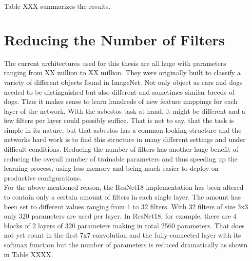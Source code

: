 Table XXX summarizes the results.

\begin{table}[h] \centering
{}
\caption{Resnet18 FiveCrop Implementation with and without pre-training. FINAL (regular) means ResNet18 with the resizing of the image instead of cropping and averaging}
\label{tbl:resnet18-randomnine}
\end{table}

\section{Reducing the Number of Filters}

The current architectures used for this thesis are all huge with parameters ranging from XX million to XX million. They were originally built to classify a variety of different objects found in ImageNet. Not only object as cars and dogs needed to be distinguished but also different and sometimes similar breeds of dogs. Thus it makes sense to learn hundreds of new feature mappings for each layer of the network. With the asbestos task at hand, it might be different and a few filters per layer could possibly suffice. That is not to say, that the task is simple in its nature, but that asbestos has a common looking structure and the networks hard work is to find this structure in many different settings and under difficult conditions. Reducing the number of filters has another huge benefit of reducing the overall number of trainable parameters and thus speeding up the learning process, using less memory and being much easier to deploy on productive configurations.\\

For the above-mentioned reason, the ResNet18 implementation has been altered to contain only a certain amount of filters in each single layer. The amount has been set to different values ranging from 1 to 32 filters. With 32 filters of size 3x3 only 320 parameters are used per layer. In ResNet18, for example, there are 4 blocks of 2 layers of 320 parameters making in total 2560 parameters. That does not yet count in the first 7x7 convolution and the fully-connected layer with its softmax function but the number of parameters is reduced dramatically as shown in Table XXXX.


